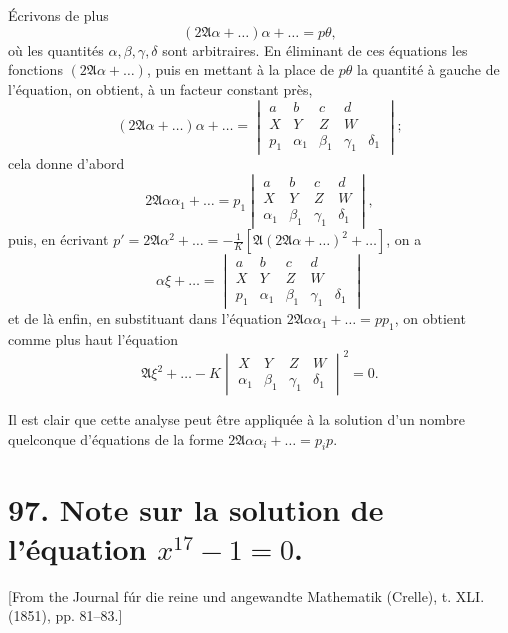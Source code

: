 \documentclass[12pt,a4paper]{article}
\theoremstyle{definition}
\begin{document}
\'{E}crivons de plus
\[
(2\mathfrak{A}\alpha + \ldots)\alpha + \ldots = p\theta,
\]
o\`{u} les quantit\'{e}s $\alpha, \beta, \gamma, \delta$ sont arbitraires. En \'{e}liminant de ces \'{e}quations les fonctions $(2\mathfrak{A}\alpha + \ldots)$, puis en mettant \`{a} la place de $p\theta$ la quantit\'{e} \`{a} gauche de l'\'{e}quation, on obtient, \`{a} un facteur constant pr\`{e}s,
\[
(2\mathfrak{A}\alpha + \ldots)\alpha + \ldots =
\begin{vmatrix}
a & b & c & d \\
X & Y & Z & W \\
p_1 & \alpha_1 & \beta_1 & \gamma_1 & \delta_1
\end{vmatrix};
\]
cela donne d'abord
\[
2\mathfrak{A}\alpha\alpha_1 + \ldots = p_1
\begin{vmatrix}
a & b & c & d \\
X & Y & Z & W \\
\alpha_1 & \beta_1 & \gamma_1 & \delta_1
\end{vmatrix},
\]
puis, en \'{e}crivant $p' = 2\mathfrak{A}\alpha^2 + \ldots = -\frac{1}{K}[\mathfrak{A}(2\mathfrak{A}\alpha + \ldots)^2 + \ldots]$, on a
\[
\alpha\xi + \ldots =
\begin{vmatrix}
a & b & c & d \\
X & Y & Z & W \\
p_1 & \alpha_1 & \beta_1 & \gamma_1 & \delta_1
\end{vmatrix}
\]
et de l\`{a} enfin, en substituant dans l'\'{e}quation $2\mathfrak{A}\alpha\alpha_1 + \ldots = pp_1$, on obtient comme plus haut l'\'{e}quation
\[
\mathfrak{A}\xi^2 + \ldots - K
\begin{vmatrix}
X & Y & Z & W \\
\alpha_1 & \beta_1 & \gamma_1 & \delta_1
\end{vmatrix}^2 = 0.
\]

Il est clair que cette analyse peut \^{e}tre appliqu\'{e}e \`{a} la solution d'un nombre quelconque d'\'{e}quations de la forme $2\mathfrak{A}\alpha\alpha_i + \ldots = p_i p$.

\newpage

\section*{97. Note sur la solution de l'\'{e}quation $x^{17} - 1 = 0$.}

[From the Journal f\'{u}r die reine und angewandte Mathematik (Crelle), t. XLI. (1851), pp. 81--83.]
\end{document}
